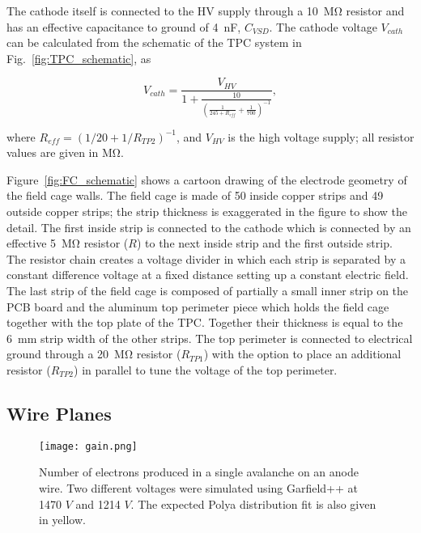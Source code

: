 The cathode itself is connected to the HV supply through a \SI{10}{\mega\ohm} resistor and has an effective capacitance to ground of \SI{4}{\nano\farad}, $C_{VSD}$. The cathode voltage $V_{cath}$ can be calculated from the schematic of the TPC system in Fig.~\ref{fig:TPC_schematic}, as

\begin{equation}
V_{cath} = \frac{V_{HV}}{ 1 + \frac{10}{ \left( \frac{1}{245 + R_{eff}} + \frac{1}{700} \right)^{-1} } },
\end{equation}

where $R_{eff} = \left( 1/20 + 1/R_{TP2} \right)^{-1}$, and $V_{HV}$ is the high voltage supply; all resistor values are given in \si{\mega\ohm}.


Figure~\ref{fig:FC_schematic} shows a cartoon drawing of the electrode geometry of the field cage walls. The field cage is made of 50 inside copper strips and 49 outside copper strips; the strip thickness is exaggerated in the figure to show the detail. The first inside strip is connected to the cathode which is connected by an effective \SI{5}{\mega\ohm} resistor ($R$) to the next inside strip and the first outside strip. The resistor chain creates a voltage divider in which each strip is separated by a constant difference voltage at a fixed distance setting up a constant electric field. The last strip of the field cage is composed of partially a small inner strip on the PCB board and the aluminum top perimeter piece which holds the field cage together with the top plate of the TPC. Together their thickness is equal to the \SI{6}{\milli\metre} strip width of the other strips. The top perimeter is connected to electrical ground through a \SI{20}{\mega\ohm} resistor ($R_{TP1}$) with the option to place an additional resistor ($R_{TP2}$) in parallel to tune the voltage of the top perimeter. 


\subsection{Wire Planes}

\begin{figure}[!htb]
\texttt{[image: gain.png]}
\caption{Number of electrons produced in a single avalanche on an anode wire. Two different voltages were simulated using Garfield++ at 1470 $V$ and 1214 $V$. The expected Polya distribution fit is also given in yellow.}
\label{fig:anodegain}
\end{figure}



